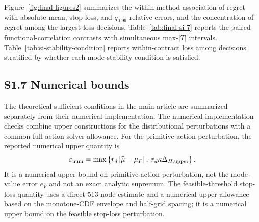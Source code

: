 \documentclass[]{interact}
\begin{document}
Figure~\ref{fig:final-figures2} summarizes the within-method association
of regret with absolute mean, stop-loss, and $q_{0.99}$ relative errors,
and the concentration of regret among the largest-loss decisions.
Table~\ref{tab:final-si-7} reports the paired functional-correlation
contrasts with simultaneous max-$|T|$ intervals.
Table~\ref{tab:si-stability-condition} reports within-contract loss
among decisions stratified by whether each mode-stability condition is
satisfied.


\subsection*{S1.7 Numerical bounds}

The theoretical sufficient conditions in the main article are
summarized separately from their numerical implementation. The
numerical implementation checks combine upper constructions for the
distributional perturbations with a common full-action solver allowance.
For the primitive-action perturbation, the reported numerical upper
quantity is
\[
\varepsilon_{\rm num}
=\max\left\{
r_d\left|\widehat\mu-\mu_F\right|,
\;r_d\kappa\Delta_{H,\rm upper}
\right\}.
\]
It is a numerical upper bound on primitive-action perturbation, not the
mode-value error $e_V$ and not an exact analytic supremum. The
feasible-threshold stop-loss quantity uses a direct 513-node estimate
and a numerical upper allowance based on the monotone-CDF envelope and
half-grid spacing; it is a numerical upper bound on the feasible
stop-loss perturbation.
\end{document}

